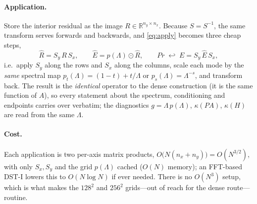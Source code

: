 \documentclass[11pt]{article}
\newcommand{\R}{\mathbb{R}}
\newcommand{\kk}{\kappa}
\begin{document}
\paragraph{Application.}
Store the interior residual as the image $R\in\R^{n_y\times n_x}$. Because $S=S^{-1}$, the same
transform serves forwards and backwards, and \eqref{eq:apply} becomes three cheap steps,
\begin{equation}
  \widehat R = S_y\,R\,S_x,
  \qquad
  \widehat E = p(\Lambda)\odot\widehat R,
  \qquad
  P r \;\hookleftarrow\; E = S_y\,\widehat E\,S_x,
  \label{eq:sineapply}
\end{equation}
i.e.\ apply $S_y$ along the rows and $S_x$ along the columns, scale each mode by the
\emph{same} spectral map $p_t(\Lambda)=(1-t)+t/\Lambda$ or $p_s(\Lambda)=\Lambda^{-s}$, and
transform back. The result is the \emph{identical} operator to the dense construction (it is the
same function of $A$), so every statement about the spectrum, conditioning and endpoints carries
over verbatim; the diagnostics $g=\Lambda\,p(\Lambda)$, $\kk(PA)$, $\kk(H)$ are read from the
same $\Lambda$.

\paragraph{Cost.}
Each application is two per-axis matrix products, $O\!\big(N(n_x+n_y)\big)=O(N^{3/2})$, with only
$S_x,S_y$ and the grid $p(\Lambda)$ cached ($O(N)$ memory); an FFT-based DST-I lowers this to
$O(N\log N)$ if ever needed. There is no $O(N^3)$ setup, which is what makes the $128^2$ and
$256^2$ grids---out of reach for the dense route---routine.
\end{document}
